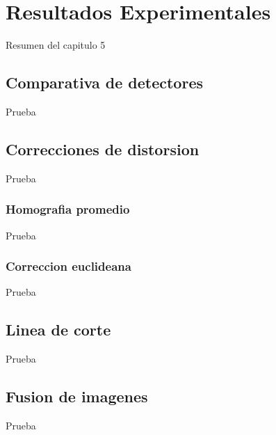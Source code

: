 \chapter{Resultados Experimentales}
\label{capitulo5}

Resumen del capitulo 5

\section{Comparativa de detectores}
Prueba

\section{Correcciones de distorsion}
Prueba

\subsection{Homografia promedio}
Prueba

\subsection{Correccion euclideana}
Prueba

\section{Linea de corte}
Prueba

\section{Fusion de imagenes}
Prueba